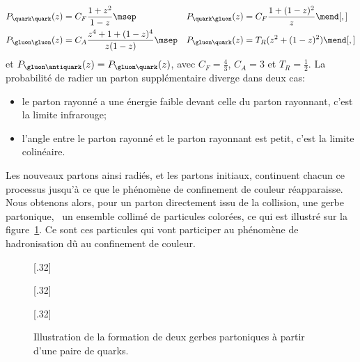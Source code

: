 \begin{align}
P_{\quark\quark}(z) &= C_F \frac{1+z^2}{1-z} \msep&
P_{\quark\gluon}(z) &= C_F \frac{1+(1-z)^2}{z} \mend[,]
\\
P_{\gluon\gluon}(z) &= C_A \frac{z^4 + 1 + (1-z)^4}{z(1-z)} \msep&
P_{\gluon\quark}(z) &= T_R (z^2+(1-z)^2) \mend[,]
\end{align}
et $P_{\gluon\antiquark}(z) = P_{\gluon\quark}(z)$,
avec
$C_F=\frac{4}{3}$,
$C_A = 3$ et
$T_R=\frac{1}{2}$.
La probabilité de radier un parton supplémentaire diverge dans deux cas:
\begin{itemize}
\item le parton rayonné a une énergie faible devant celle du parton rayonnant, c'est la limite infrarouge;
\item l'angle entre le parton rayonné et le parton rayonnant est petit, c'est la limite colinéaire.
\end{itemize}
\par Les nouveaux partons ainsi radiés, et les partons initiaux, continuent chacun ce processus jusqu'à ce que le phénomène de confinement de couleur réapparaisse. Nous obtenons alors, pour un parton directement issu de la collision, une gerbe partonique, \ie\ un ensemble collimé de particules colorées, ce qui est illustré sur la figure~\ref{fig-parton_shower}.
Ce sont ces particules qui vont participer au phénomène de hadronisation dû au confinement de couleur.
\begin{figure}[h]
\centering
{}[.32\textwidth]
{\begin{tikzpicture}

\end{tikzpicture}}
\hfill
{}[.32\textwidth]
{\begin{tikzpicture}


\end{tikzpicture}}
\hfill
{}[.32\textwidth]
{\begin{tikzpicture}



\end{tikzpicture}}

\caption{Illustration de la formation de deux gerbes partoniques à partir d'une paire de quarks.}
\label{fig-parton_shower}
\end{figure}

